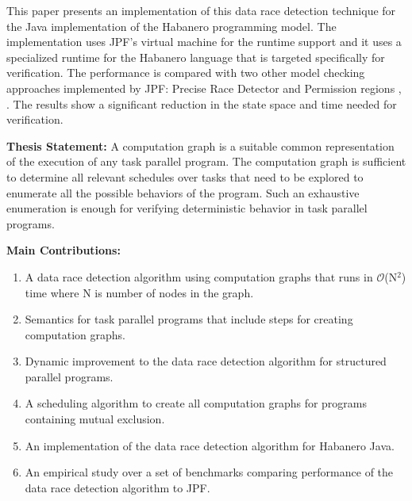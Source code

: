 This paper presents an implementation of this data race detection technique for the Java implementation of the Habanero programming model. The implementation uses JPF's virtual machine for the runtime support and it uses a specialized runtime for the Habanero language that is targeted specifically for verification\cite{mercer2015model, anderson2014jpf}. The performance is compared with two other model checking approaches implemented by JPF: Precise Race Detector and Permission regions \cite{kulikov2010detecting}, \cite{mercer2015model}. The results show a significant reduction in the state space and time needed for verification.

\textbf{Thesis Statement:}
A computation graph is a suitable common representation of the execution of any task parallel program. The computation graph is sufficient to determine all relevant schedules over tasks that need to be explored to enumerate all the possible behaviors of the program. Such an exhaustive enumeration is enough for verifying deterministic behavior in task parallel programs.

\textbf{Main Contributions:}
\begin{enumerate}
\item A data race detection algorithm using computation graphs that runs in $\mathcal{O}$(N$^2$) time where N is number of nodes in the graph.
\item Semantics for task parallel programs that include steps for creating computation graphs.
\item Dynamic improvement to the data race detection algorithm for structured parallel programs.
\item A scheduling algorithm to create all computation graphs for programs containing mutual exclusion.
\item An implementation of the data race detection algorithm for Habanero Java.
\item An empirical study over a set of benchmarks comparing performance of the data race detection algorithm to JPF.
\end{enumerate}